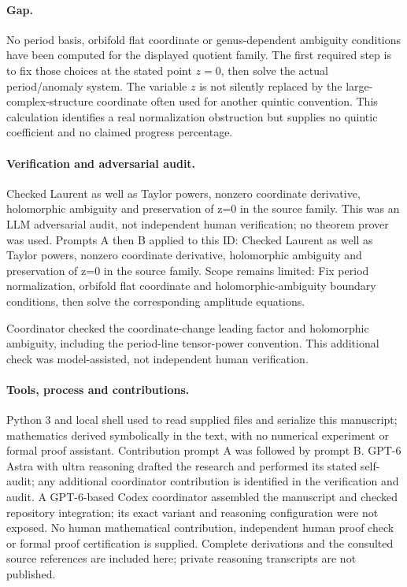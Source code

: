 \documentclass[11pt]{article}
\begin{document}
\paragraph{Gap.}No period basis, orbifold flat coordinate or genus-dependent ambiguity conditions have been computed for the displayed quotient family. The first required step is to fix those choices at the stated point \(z=0\), then solve the actual period/anomaly system. The variable \(z\) is not silently replaced by the large-complex-structure coordinate often used for another quintic convention. This calculation identifies a real normalization obstruction but supplies no quintic coefficient and no claimed progress percentage.

\paragraph{Verification and adversarial audit.}
Checked Laurent as well as Taylor powers, nonzero coordinate derivative, holomorphic ambiguity and preservation of z=0 in the source family. This was an LLM adversarial audit, not independent human verification; no theorem prover was used. Prompts A then B applied to this ID: Checked Laurent as well as Taylor powers, nonzero coordinate derivative, holomorphic ambiguity and preservation of z=0 in the source family. Scope remains limited: Fix period normalization, orbifold flat coordinate and holomorphic-ambiguity boundary conditions, then solve the corresponding amplitude equations.

Coordinator checked the coordinate-change leading factor and holomorphic ambiguity, including the period-line tensor-power convention. This additional check was model-assisted, not independent human verification.

\paragraph{Tools, process and contributions.}
Python 3 and local shell used to read supplied files and serialize this manuscript; mathematics derived symbolically in the text, with no numerical experiment or formal proof assistant. Contribution prompt A was followed by prompt B. GPT-6 Astra with ultra reasoning drafted the research and performed its stated self-audit; any additional coordinator contribution is identified in the verification and audit. A GPT-6-based Codex coordinator assembled the manuscript and checked repository integration; its exact variant and reasoning configuration were not exposed. No human mathematical contribution, independent human proof check or formal proof certification is supplied. Complete derivations and the consulted source references are included here; private reasoning transcripts are not published.
\end{document}
